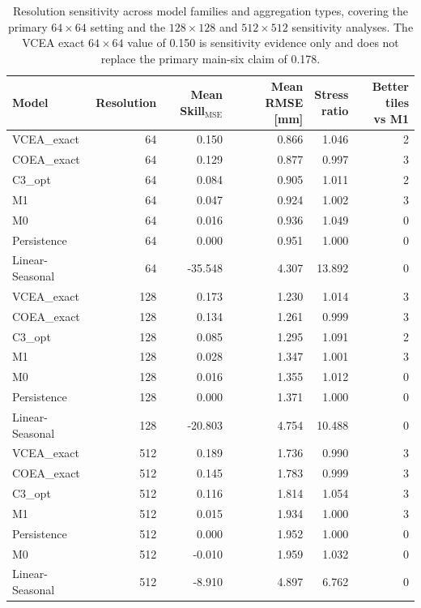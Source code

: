 \documentclass[lettersize,journal]{IEEEtran}
\begin{document}
\begin{table}[!t]
  \centering
  \caption{Resolution sensitivity across model families and aggregation types, covering the primary $64\times64$ setting and the $128\times128$ and $512\times512$ sensitivity analyses. The VCEA exact $64\times64$ value of 0.150 is sensitivity evidence only and does not replace the primary main-six claim of 0.178.}
  \label{tab:table10}
  \scriptsize
  \begin{adjustbox}{max width=\textwidth}
  \begin{tabular}{lrrrrr}
    \toprule
    Model & Resolution & \shortstack{Mean\\Skill$_{\mathrm{MSE}}$} & Mean RMSE [mm] & \shortstack{Stress\\ratio} & \shortstack{Better tiles\\vs M1} \\
    \midrule
    VCEA\_exact & 64 & 0.150 & 0.866 & 1.046 & 2 \\
    COEA\_exact & 64 & 0.129 & 0.877 & 0.997 & 3 \\
    C3\_opt & 64 & 0.084 & 0.905 & 1.011 & 2 \\
    M1 & 64 & 0.047 & 0.924 & 1.002 & 3 \\
    M0 & 64 & 0.016 & 0.936 & 1.049 & 0 \\
    Persistence & 64 & 0.000 & 0.951 & 1.000 & 0 \\
    Linear-Seasonal & 64 & -35.548 & 4.307 & 13.892 & 0 \\
    VCEA\_exact & 128 & 0.173 & 1.230 & 1.014 & 3 \\
    COEA\_exact & 128 & 0.134 & 1.261 & 0.999 & 3 \\
    C3\_opt & 128 & 0.085 & 1.295 & 1.091 & 2 \\
    M1 & 128 & 0.028 & 1.347 & 1.001 & 3 \\
    M0 & 128 & 0.016 & 1.355 & 1.012 & 0 \\
    Persistence & 128 & 0.000 & 1.371 & 1.000 & 0 \\
    Linear-Seasonal & 128 & -20.803 & 4.754 & 10.488 & 0 \\
    VCEA\_exact & 512 & 0.189 & 1.736 & 0.990 & 3 \\
    COEA\_exact & 512 & 0.145 & 1.783 & 0.999 & 3 \\
    C3\_opt & 512 & 0.116 & 1.814 & 1.054 & 3 \\
    M1 & 512 & 0.015 & 1.934 & 1.000 & 3 \\
    Persistence & 512 & 0.000 & 1.952 & 1.000 & 0 \\
    M0 & 512 & -0.010 & 1.959 & 1.032 & 0 \\
    Linear-Seasonal & 512 & -8.910 & 4.897 & 6.762 & 0 \\
    \bottomrule
  \end{tabular}
  \end{adjustbox}
\end{table}
\end{document}
